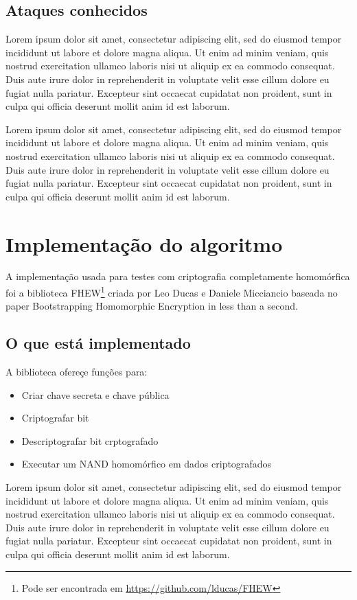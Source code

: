 	\subsection{Ataques conhecidos}
	Lorem ipsum dolor sit amet, consectetur adipiscing elit, sed do eiusmod tempor incididunt ut labore et dolore magna aliqua. Ut enim ad minim veniam, quis nostrud exercitation ullamco laboris nisi ut aliquip ex ea commodo consequat. Duis aute irure dolor in reprehenderit in voluptate velit esse cillum dolore eu fugiat nulla pariatur. Excepteur sint occaecat cupidatat non proident, sunt in culpa qui officia deserunt mollit anim id est laborum.
	
	Lorem ipsum dolor sit amet, consectetur adipiscing elit, sed do eiusmod tempor incididunt ut labore et dolore magna aliqua. Ut enim ad minim veniam, quis nostrud exercitation ullamco laboris nisi ut aliquip ex ea commodo consequat. Duis aute irure dolor in reprehenderit in voluptate velit esse cillum dolore eu fugiat nulla pariatur. Excepteur sint occaecat cupidatat non proident, sunt in culpa qui officia deserunt mollit anim id est laborum.

\newpage

\section{Implementação do algoritmo}\label{sec:LABEL_CHP_1_SEC_F}
A implementação usada para testes com criptografia completamente homomórfica foi a biblioteca FHEW\footnote{Pode ser encontrada em \url{https://github.com/lducas/FHEW}} criada por Leo Ducas e Daniele Micciancio baseada no paper Bootstrapping Homomorphic Encryption in less than a second.
	
	\subsection{O que está implementado}
	A biblioteca ofereçe funções para:
	\begin{itemize}
		\item Criar chave secreta e chave pública
		\item Criptografar bit
		\item Descriptografar bit crptografado
		\item Executar um NAND homomórfico em dados criptografados
	\end{itemize}

	Lorem ipsum dolor sit amet, consectetur adipiscing elit, sed do eiusmod tempor incididunt ut labore et dolore magna aliqua. Ut enim ad minim veniam, quis nostrud exercitation ullamco laboris nisi ut aliquip ex ea commodo consequat. Duis aute irure dolor in reprehenderit in voluptate velit esse cillum dolore eu fugiat nulla pariatur. Excepteur sint occaecat cupidatat non proident, sunt in culpa qui officia deserunt mollit anim id est laborum.	
	

